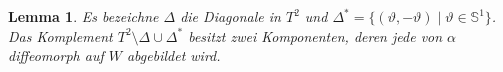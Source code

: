 \documentclass[paper=A4, twoside, chapterprefix=true, bibliography=totoc, headsepline]{scrbook}
\renewcommand{\thesection}{\arabic{section}}
\renewcommand*{\sectionmarkformat}{\thesection\autodot\enskip}
\let\temp\phi
\let\phi\varphi
\let\varphi\temp
\let\temp\theta
\let\theta\vartheta
\let\vartheta\temp
\let\temp\epsilon
\let\epsilon\varepsilon
\let\varepsilon\temp
\let\temp\rho
\let\rho\varrho
\let\varrho\temp
\renewcommand{\S}{\mathbb{S}}
\theoremstyle{break}
\theoremstyle{nonumberbreak}
\newtheorem{lemma}{Lemma}
\theoremstyle{emptybreak}
\theoremstyle{break}
\begin{document}
\begin{lemma}
Es bezeichne $\Delta$ die Diagonale in $T^2$ und $\Delta^* = \{(\theta, -\theta) \mid \theta \in \S^1\}$.
Das Komplement $T^2 \setminus \Delta \cup \Delta^*$ besitzt zwei Komponenten, deren jede von $\alpha$ diffeomorph auf $W$ abgebildet wird.
\end{lemma}




\appendix


\renewcommand*{\othersectionlevelsformat}[3]{\ifstr{#1}{section}{\"Ubung\ #3\ vom\ }{#3\autodot\enskip}}

\renewcommand*{\sectionmarkformat}{\"Ubung \thesection\autodot\ vom\enskip}


\printindex





\end{document}
